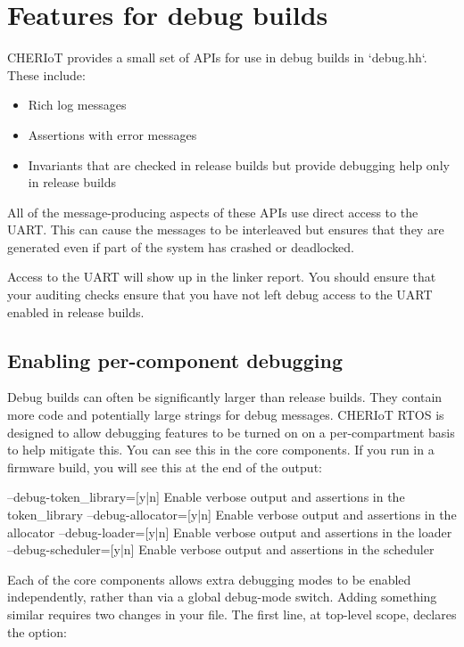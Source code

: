 \chapter[label=debug]{Features for debug builds}

CHERIoT provides a small set of APIs for use in debug builds in `debug.hh`.
These include:

\begin{itemize}
	\item{Rich log messages}
	\item{Assertions with error messages}
	\item{Invariants that are checked in release builds but provide debugging help only in release builds}
\end{itemize}

All of the message-producing aspects of these APIs use direct access to the UART.
This can cause the messages to be interleaved but ensures that they are generated even if part of the system has crashed or deadlocked.

Access to the UART will show up in the linker report.
You should ensure that your auditing checks ensure that you have not left debug access to the UART enabled in release builds.

\section{Enabling per-component debugging}

Debug builds can often be significantly larger than release builds.
They contain more code and potentially large strings for debug messages.
CHERIoT RTOS is designed to allow debugging features to be turned on on a per-compartment basis to help mitigate this.
You can see this in the core components.
If you run  in a firmware build, you will see this at the end of the output:

\begin{console}
--debug-token_library=[y|n] Enable verbose output and assertions in the token_library
--debug-allocator=[y|n]     Enable verbose output and assertions in the allocator
--debug-loader=[y|n]        Enable verbose output and assertions in the loader
--debug-scheduler=[y|n]     Enable verbose output and assertions in the scheduler
\end{console}

Each of the core components allows extra debugging modes to be enabled independently, rather than via a global debug-mode switch.
Adding something similar requires two changes in your  file.
The first line, at top-level scope, declares the option:

